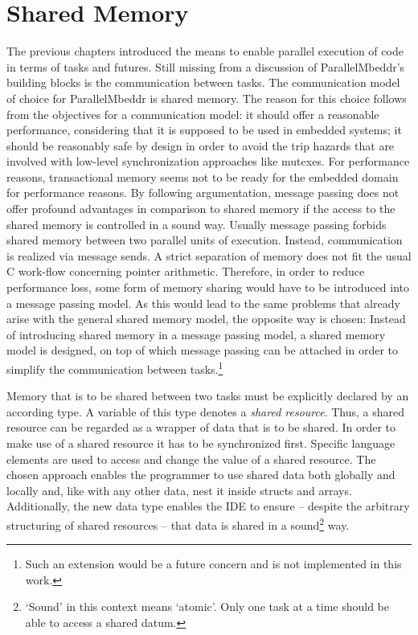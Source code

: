 \section{Shared Memory}
\label{sharedMemory}
The previous chapters introduced the means to enable parallel execution of code in terms of tasks and futures. Still missing from a discussion of ParallelMbeddr's building blocks is the communication between tasks. The communication model of choice for ParallelMbeddr is shared memory. The reason for this choice follows from the objectives for a communication model: it should offer a reasonable performance, considering that it is supposed to be used in embedded systems; it should be reasonably safe by design in order to avoid the trip hazards that are involved with low-level synchronization approaches like mutexes. For performance reasons, transactional memory seems not to be ready for the embedded domain for performance reasons. By following argumentation, message passing does not offer profound advantages in comparison to shared memory if the access to the shared memory is controlled in a sound way. Usually message passing forbids shared memory between two parallel units of execution. Instead, communication is realized via message sends. A strict separation of memory does not fit the usual C work-flow concerning pointer arithmetic. Therefore, in order to reduce performance loss, some form of memory sharing would have to be introduced into a message passing model. As this would lead to the same problems that already arise with the general shared memory model, the opposite way is chosen: Instead of introducing shared memory in a message passing model, a shared memory model is designed, on top of which message passing can be attached in order to simplify the communication between tasks.\footnote{Such an extension would be a future concern and is not implemented in this work.}

Memory that is to be shared between two tasks must be explicitly declared by an according type. A variable of this type denotes a \textit{shared resource}. Thus, a shared resource can be regarded as a wrapper of data that is to be shared. In order to make use of a shared resource it has to be synchronized first. Specific language elements are used to access and change the value of a shared resource. The chosen approach enables the programmer to use shared data both globally and locally and, like with any other data, nest it inside structs and arrays. Additionally, the new data type enables the IDE to ensure -- despite the arbitrary structuring of shared resources -- that data is shared in a sound\footnote{`Sound' in this context means `atomic'. Only one task at a time should be able to access a shared datum.} way.

